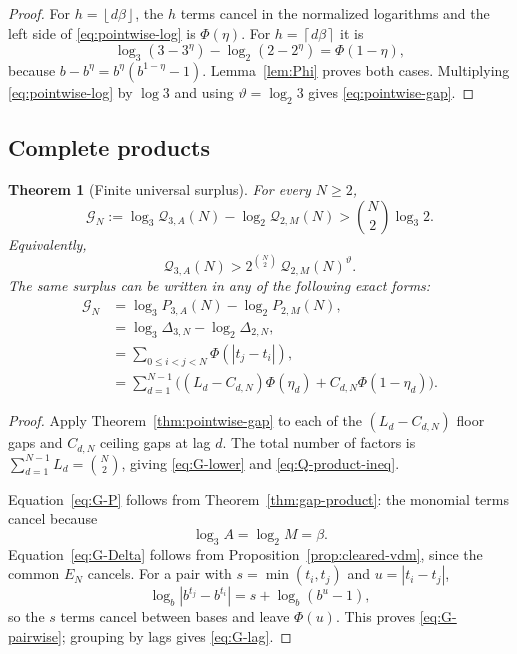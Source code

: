 \documentclass[11pt,oneside]{article}
\newtheorem{theorem}{Theorem}[section]
\theoremstyle{definition}
\theoremstyle{remark}
\newcommand{\floor}[1]{\left\lfloor #1\right\rfloor}
\newcommand{\ceil}[1]{\left\lceil #1\right\rceil}
\newcommand{\thetaq}{\vartheta}
\begin{document}
\begin{proof}
For $h=\floor{d\beta}$, the $h$ terms cancel in the normalized logarithms and the left side of
\eqref{eq:pointwise-log} is $\Phi(\eta)$.  For $h=\ceil{d\beta}$ it is
\[
 \log_3(3-3^\eta)-\log_2(2-2^\eta)=\Phi(1-\eta),
\]
because $b-b^\eta=b^\eta(b^{1-\eta}-1)$.  Lemma~\ref{lem:Phi} proves both cases.
Multiplying \eqref{eq:pointwise-log} by $\log3$ and using
$\thetaq=\log_2 3$ gives \eqref{eq:pointwise-gap}.
\end{proof}

\subsection{Complete products}

\begin{theorem}[Finite universal surplus]
\label{thm:finite-surplus}
For every $N\ge2$,
\begin{equation}
 \mathcal G_N:=
 \log_3\mathcal Q_{3,A}(N)
 -\log_2\mathcal Q_{2,M}(N)
 >\binom N2\log_3 2.
 \label{eq:G-lower}
\end{equation}
Equivalently,
\begin{equation}
 \mathcal Q_{3,A}(N)>
 2^{\binom N2}\,\mathcal Q_{2,M}(N)^{\thetaq}.
 \label{eq:Q-product-ineq}
\end{equation}
The same surplus can be written in any of the following exact forms:
\begin{align}
 \mathcal G_N
 &=\log_3 P_{3,A}(N)
   -\log_2 P_{2,M}(N),
 \label{eq:G-P}\\
 &=\log_3\Delta_{3,N}
   -\log_2\Delta_{2,N},
 \label{eq:G-Delta}\\
 &=\sum_{0\le i<j<N}\Phi(|t_j-t_i|),
 \label{eq:G-pairwise}\\
 &=\sum_{d=1}^{N-1}
 \bigl((L_d-C_{d,N})\Phi(\eta_d)
       +C_{d,N}\Phi(1-\eta_d)\bigr).
 \label{eq:G-lag}
\end{align}
\end{theorem}

\begin{proof}
Apply Theorem~\ref{thm:pointwise-gap} to each of the
$(L_d-C_{d,N})$ floor gaps and $C_{d,N}$ ceiling gaps at lag $d$.  The total number of factors
is $\sum_{d=1}^{N-1}L_d=\binom N2$, giving \eqref{eq:G-lower} and
\eqref{eq:Q-product-ineq}.

Equation~\eqref{eq:G-P} follows from Theorem~\ref{thm:gap-product}: the monomial terms cancel
because
\[
 \log_3 A=\log_2 M=\beta.
\]
Equation~\eqref{eq:G-Delta} follows from Proposition~\ref{prop:cleared-vdm}, since the common
$E_N$ cancels.  For a pair with $s=\min(t_i,t_j)$ and $u=|t_i-t_j|$,
\[
 \log_b|b^{t_j}-b^{t_i}|=s+\log_b(b^u-1),
\]
so the $s$ terms cancel between bases and leave $\Phi(u)$.  This proves
\eqref{eq:G-pairwise}; grouping by lags gives \eqref{eq:G-lag}.
\end{proof}
\end{document}
